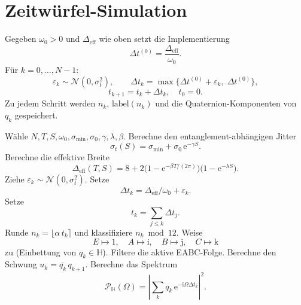 \documentclass[11pt,a4paper]{article}
\begin{document}
\section{Zeitwürfel-Simulation}

Gegeben $\omega_0>0$ und $\Delta_{\mathrm{eff}}$ wie oben setzt die Implementierung
\begin{equation}
  \Delta t^{(0)} = \frac{\Delta_{\mathrm{eff}}}{\omega_0}.
\end{equation}
Für $k=0,\ldots,N-1$:
\begin{equation}
  \varepsilon_k \sim \mathcal{N}(0,\sigma_t^2),\qquad
  \Delta t_k = \max\bigl\{\Delta t^{(0)}+\varepsilon_k,\;\Delta t^{(0)}\bigr\},
\end{equation}
\begin{equation}
  t_{k+1} = t_k + \Delta t_k,\quad t_0=0.
\end{equation}
Zu jedem Schritt werden $n_k$, $\mathrm{label}(n_k)$ und die Quaternion-Komponenten
von $q_k$ gespeichert.

\begin{algorithm}[htbp]
  \caption{Ablauf der Zeitwürfel-Simulation und nachgeschaltete Auswertung
    ($\Delta_{\mathrm{eff}}$ hier mit Temperaturfaktor $\beta$ wie in \texttt{delta\_eff\_sharp};
    in der Implementierung wird $\Delta t_k$ zusätzlich nach unten durch $\Delta_{\mathrm{eff}}/\omega_0$
    begrenzt, falls $\varepsilon_k$ zu negativ ausfällt).
    Die kompakte Schreibweise $\mathcal{P}_{\mathbb{H}}$ entspricht im Code der Summe der kanalweisen
    Leistungen $|Q_X|^2$, $X\in\{e,a,b,c\}$, vgl.\ Abschnitt~\ref{sec:spektrum}.}
  \label{alg:zeitwuerfel}
  \begin{algorithmic}[1]
    \State Wähle $N,T,S,\omega_0,\sigma_{\min},\sigma_0,\gamma,\lambda,\beta$.
    \State Berechne den entanglement-abhängigen Jitter
    \[
      \sigma_t(S)=\sigma_{\min}+\sigma_0\,\mathrm{e}^{-\gamma S}.
    \]
    \State Berechne die effektive Breite
    \[
      \Delta_{\mathrm{eff}}(T,S)
      =
      8+
      2\bigl(1-\mathrm{e}^{-\beta T/(2\pi)}\bigr)\bigl(1-\mathrm{e}^{-\lambda S}\bigr).
    \]
      \State Ziehe $\varepsilon_k\sim\mathcal{N}(0,\sigma_t^2)$.
      \State Setze
      \[
        \Delta t_k=\Delta_{\mathrm{eff}}/\omega_0+\varepsilon_k.
      \]
      \State Setze
      \[
        t_k=\sum_{j\leq k}\Delta t_j.
      \]
      \State Runde $n_k=\lfloor \alpha\, t_k\rceil$ und klassifiziere $n_k\bmod 12$.
      \State Weise
      \[
        E\mapsto 1,\quad A\mapsto \mathrm{i},\quad B\mapsto \mathrm{j},\quad C\mapsto \mathrm{k}
      \]
      zu (Einbettung von $q_k\in\mathbb{H}$).
    \EndFor
    \State Filtere die aktive EABC-Folge.
    \State Berechne den Schwung $u_k=\overline{q_k}\,q_{k+1}$.
    \State Berechne das Spektrum
    \[
      \mathcal{P}_{\mathbb H}(\Omega)
      =
      \left|
      \sum_k q_k\,\mathrm{e}^{-\mathrm{i}\Omega\Delta t_k}
      \right|^2.
    \]
  \end{algorithmic}
\end{algorithm}
\end{document}
